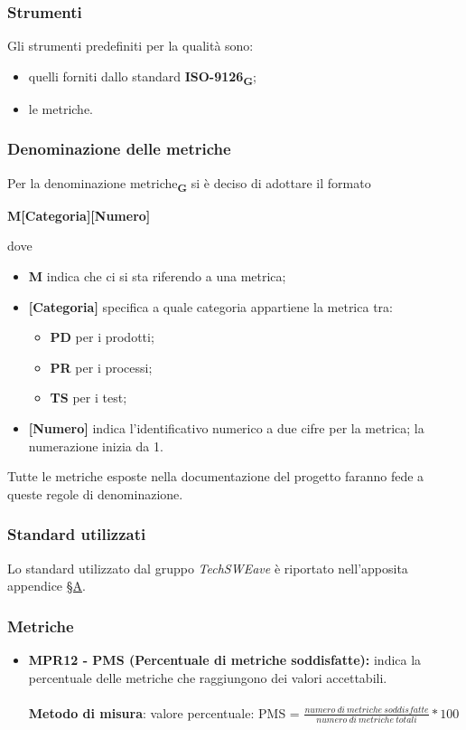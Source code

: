 \subsubsection{Strumenti}
Gli strumenti predefiniti per la qualità sono:
\begin{itemize}
    \item quelli forniti dallo standard \textbf{ISO-9126}\textsubscript{\textbf{G}};
    \item le metriche.
\end{itemize}
\subsubsection{Denominazione delle metriche}
Per la denominazione metriche\textsubscript{\textbf{G}} si è deciso di adottare il formato
\begin{center}
    \textbf{M[Categoria][Numero]}
\end{center}
dove
\begin{itemize}
    \item \textbf{M} indica che ci si sta riferendo a una metrica;
    \item \textbf{[Categoria]} specifica a quale categoria appartiene la metrica tra:\begin{itemize}
              \item \textbf{PD} per i prodotti;
              \item \textbf{PR} per i processi;
              \item \textbf{TS} per i test;
          \end{itemize}
    \item \textbf{[Numero]} indica l'identificativo numerico a due cifre per la metrica; la numerazione inizia da 1.
\end{itemize}
Tutte le metriche esposte nella documentazione del progetto faranno fede a queste regole di denominazione.
\subsubsection{Standard utilizzati}
Lo standard utilizzato dal gruppo \textit{TechSWEave} è riportato nell'apposita appendice \hyperref[sec:A]{§A}.
\subsubsection{Metriche}
\begin{itemize}
    \item \textbf{MPR12 - PMS (Percentuale di metriche soddisfatte):} indica la percentuale delle metriche che raggiungono dei valori accettabili.\\
          \\\textbf{Metodo di misura}: valore percentuale: PMS = $\frac{numero \ di \ metriche \ soddisfatte}{numero \ di \ metriche \ totali} * 100$
\end{itemize}

